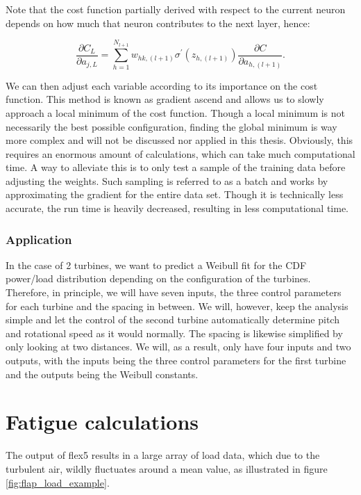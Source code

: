 Note that the cost function partially derived with respect to the current neuron depends on how much that neuron contributes to the next layer, hence:

\begin{equation}
\frac{\partial C_L}{\partial a_{j,L}} = \sum_{h=1}^{N_{l+1}} w_{h k,(l+1)} \sigma^{\prime}\left(z_{h,(l+1)}\right) \frac{\partial C}{\partial a_{h,(l+1)}}.
\end{equation}


We can then adjust each variable according to its importance on the cost function. This method is known as gradient ascend and allows us to slowly approach a local minimum of the cost function. Though a local minimum is not necessarily the best possible configuration, finding the global minimum is way more complex and will not be discussed nor applied in this thesis. Obviously, this requires an enormous amount of calculations, which can take much computational time. A way to alleviate this is to only test a sample of the training data before adjusting the weights. Such sampling is referred to as a batch and works by approximating the gradient for the entire data set. Though it is technically less accurate, the run time is heavily decreased, resulting in less computational time.


\subsubsection*{Application}

In the case of 2 turbines, we want to predict a Weibull fit for the CDF power/load distribution depending on the configuration of the turbines. Therefore, in principle, we will have seven inputs, the three control parameters for each turbine and the spacing in between. We will, however, keep the analysis simple and let the control of the second turbine automatically determine pitch and rotational speed as it would normally. The spacing is likewise simplified by only looking at two distances. We will, as a result, only have four inputs and two outputs, with the inputs being the three control parameters for the first turbine and the outputs being the Weibull constants.

\section{Fatigue calculations}

The output of flex5 results in a large array of load data, which due to the turbulent air, wildly fluctuates around a mean value, as illustrated in figure \ref{fig:flap_load_example}. 

